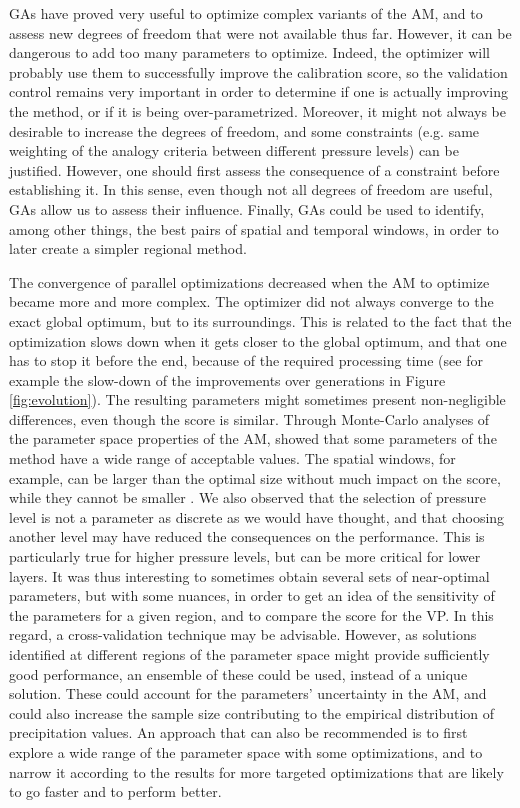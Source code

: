 \documentclass[review]{elsarticle}
\begin{document}
GAs have proved very useful to optimize complex variants of the AM, and to assess new degrees of freedom that were not available thus far. However, it can be dangerous to add too many parameters to optimize. Indeed, the optimizer will probably use them to successfully improve the calibration score, so the validation control remains very important in order to determine if one is actually improving the method, or if it is being over-parametrized. Moreover, it might not always be desirable to increase the degrees of freedom, and some constraints (e.g. same weighting of the analogy criteria between different pressure levels) can be justified. However, one should first assess the consequence of a constraint before establishing it. In this sense, even though not all degrees of freedom are useful, GAs allow us to assess their influence. Finally, GAs could be used to identify, among other things, the best pairs of spatial and temporal windows, in order to later create a simpler regional method.

The convergence of parallel optimizations decreased when the AM to optimize became more and more complex. The optimizer did not always converge to the exact global optimum, but to its surroundings. This is related to the fact that the optimization slows down when it gets closer to the global optimum, and that one has to stop it before the end, because of the required processing time (see for example the slow-down of the improvements over generations in Figure \ref{fig:evolution}). The resulting parameters might sometimes present non-negligible differences, even though the score is similar. Through Monte-Carlo analyses of the parameter space properties of the AM, \citet{Horton2012a} showed that some parameters of the method have a wide range of acceptable values. The spatial windows, for example, can be larger than the optimal size without much impact on the score, while they cannot be smaller \citep[see also][]{Bontron2004}. We also observed that the selection of pressure level is not a parameter as discrete as we would have thought, and that choosing another level may have reduced the consequences on the performance. This is particularly true for higher pressure levels, but can be more critical for lower layers. It was thus interesting to sometimes obtain several sets of near-optimal parameters, but with some nuances, in order to get an idea of the sensitivity of the parameters for a given region, and to compare the score for the VP. In this regard, a cross-validation technique may be advisable. However, as solutions identified at different regions of the parameter space might provide sufficiently good performance, an ensemble of these could be used, instead of a unique solution. These could account for the parameters’ uncertainty in the AM, and could also increase the sample size contributing to the empirical distribution of precipitation values. An approach that can also be recommended is to first explore a wide range of the parameter space with some optimizations, and to narrow it according to the results for more targeted optimizations that are likely to go faster and to perform better.
\end{document}

